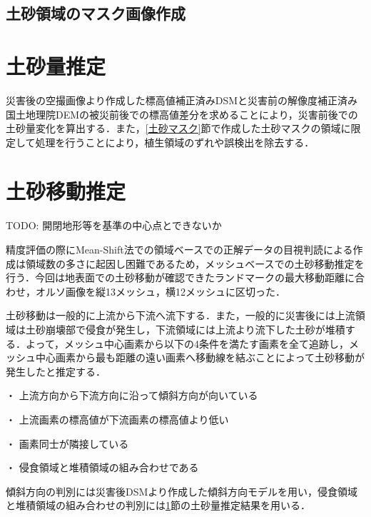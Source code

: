     \subsection{土砂領域のマスク画像作成}

  
  \section{土砂量推定}
    \label{土砂量推定}
    災害後の空撮画像より作成した標高値補正済みDSMと災害前の解像度補正済み国土地理院DEMの被災前後での標高値差分を求めることにより，災害前後での土砂量変化を算出する．また，\ref{土砂マスク}節で作成した土砂マスクの領域に限定して処理を行うことにより，植生領域のずれや誤検出を除去する．
  

  \section{土砂移動推定}
    \label{土砂移動推定}
      TODO: 開閉地形等を基準の中心点とできないか

    精度評価の際にMean-Shift法での領域ベースでの正解データの目視判読による作成は領域数の多さに起因し困難であるため，メッシュベースでの土砂移動推定を行う．今回は地表面での土砂移動が確認できたランドマークの最大移動距離に合わせ，オルソ画像を縦13メッシュ，横12メッシュに区切った．

    土砂移動は一般的に上流から下流へ流下する．また，一般的に災害後には上流領域は土砂崩壊部で侵食が発生し，下流領域には上流より流下した土砂が堆積する．よって，メッシュ中心画素から以下の4条件を満たす画素を全て追跡し，メッシュ中心画素から最も距離の遠い画素へ移動線を結ぶことによって土砂移動が発生したと推定する．

    ・	上流方向から下流方向に沿って傾斜方向が向いている

    ・	上流画素の標高値が下流画素の標高値より低い
    
    ・	画素同士が隣接している
    
    ・	侵食領域と堆積領域の組み合わせである

    傾斜方向の判別には災害後DSMより作成した傾斜方向モデルを用い，侵食領域と堆積領域の組み合わせの判別には\ref{土砂量推定}節の土砂量推定結果を用いる．
  

